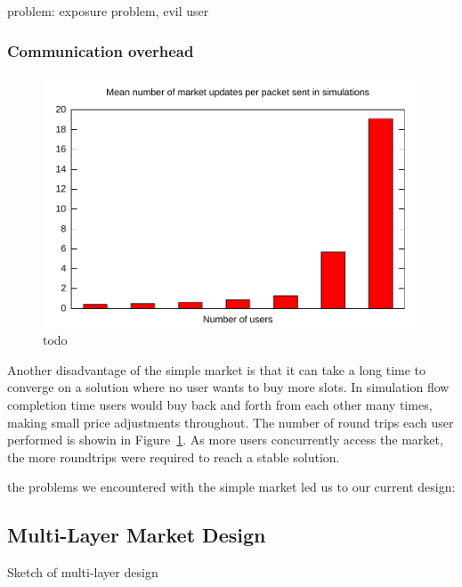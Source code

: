 problem: exposure problem, evil user

\subsubsection{Communication overhead}

\begin{figure}
\includegraphics[width=\columnwidth]{plots/num_market_updates.pdf}
\caption{todo}
\label{f:num_market_updates}
\end{figure}

Another disadvantage of the simple market is that it can take a long time to converge on a solution where no user wants to buy more slots. In simulation flow completion time users would buy back and forth from each other many times, making small price adjustments throughout. The number of round trips each user performed is showin in Figure~\ref{f:num_market_updates}. As more users concurrently access the market, the more roundtrips were required to reach a stable solution.


the problems we encountered with the simple market led us to our current design:
\subsection{Multi-Layer Market Design}

Sketch of multi-layer design
